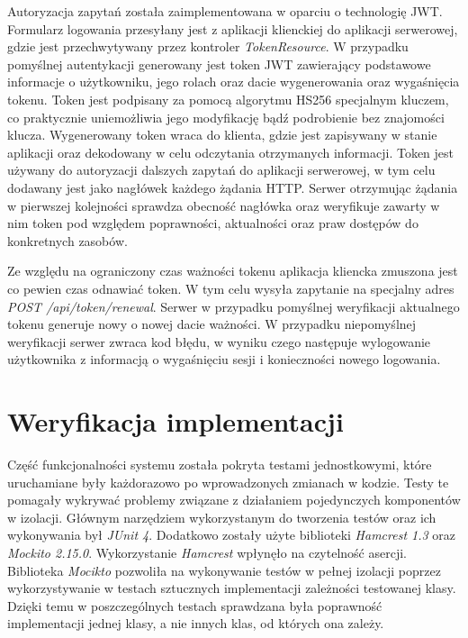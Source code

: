 Autoryzacja zapytań została zaimplementowana w oparciu o technologię JWT. Formularz logowania przesyłany jest z aplikacji klienckiej do aplikacji serwerowej, gdzie jest przechwytywany przez kontroler \textit{TokenResource}. W przypadku pomyślnej autentykacji generowany jest token JWT zawierający podstawowe informacje o użytkowniku, jego rolach oraz dacie wygenerowania oraz wygaśnięcia tokenu. Token jest podpisany za pomocą algorytmu HS256 specjalnym kluczem, co praktycznie uniemożliwia jego modyfikację bądź podrobienie bez znajomości klucza. Wygenerowany token wraca do klienta, gdzie jest zapisywany w stanie aplikacji oraz dekodowany w celu odczytania otrzymanych informacji. Token jest używany do autoryzacji dalszych zapytań do aplikacji serwerowej, w tym celu dodawany jest jako nagłówek każdego żądania HTTP. Serwer otrzymując żądania w pierwszej kolejności sprawdza obecność nagłówka oraz weryfikuje zawarty w nim token pod względem poprawności, aktualności oraz praw dostępów do konkretnych zasobów. 

Ze względu na ograniczony czas ważności tokenu aplikacja kliencka zmuszona jest co pewien czas odnawiać token. W tym celu wysyła zapytanie na specjalny adres \textit{POST /api/token/renewal}. Serwer w przypadku pomyślnej weryfikacji aktualnego tokenu generuje nowy o nowej dacie ważności. W przypadku niepomyślnej weryfikacji serwer zwraca kod błędu, w wyniku czego następuje wylogowanie użytkownika z informacją o wygaśnięciu sesji i konieczności nowego logowania.

\section{Weryfikacja implementacji}

Część funkcjonalności systemu została pokryta testami jednostkowymi, które uruchamiane były każdorazowo po wprowadzonych zmianach w kodzie. Testy te pomagały wykrywać problemy związane z działaniem pojedynczych komponentów w izolacji. Głównym narzędziem wykorzystanym do tworzenia testów oraz ich wykonywania był \textit{JUnit 4}. Dodatkowo zostały użyte biblioteki \textit{Hamcrest 1.3} oraz \textit{Mockito 2.15.0}. Wykorzystanie \textit{Hamcrest} wpłynęło na czytelność asercji. Biblioteka \textit{Mocikto} pozwoliła na wykonywanie testów w pełnej izolacji poprzez wykorzystywanie w testach sztucznych implementacji zależności testowanej klasy. Dzięki temu w poszczególnych testach sprawdzana była poprawność implementacji jednej klasy, a nie innych klas, od których ona zależy.


